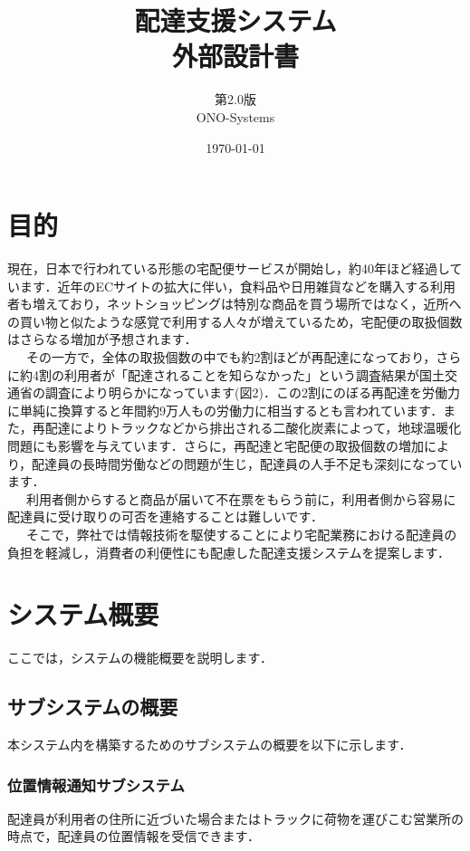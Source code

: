 \documentclass[a4j,titlepage]{jarticle}
\title{\huge 配達支援システム\\
		外部設計書}
\author{第2.0版\\
        ONO-Systems\\}
\date{\today}
\begin{document}
\maketitle

\tableofcontents
\clearpage

\section{目的}
現在，日本で行われている形態の宅配便サービスが開始し，約40年ほど経過しています．近年のECサイトの拡大に伴い，食料品や日用雑貨などを購入する利用者も増えており，ネットショッピングは特別な商品を買う場所ではなく，近所への買い物と似たような感覚で利用する人々が増えているため，宅配便の取扱個数はさらなる増加が予想されます\cite{ref1}．\\
\ \ \ その一方で，全体の取扱個数の中でも約2割ほどが再配達になっており，さらに約4割の利用者が「配達されることを知らなかった」という調査結果が国土交通省の調査により明らかになっています(図2)．この2割にのぼる再配達を労働力に単純に換算すると年間約9万人もの労働力に相当するとも言われています．また，再配達によりトラックなどから排出される二酸化炭素によって，地球温暖化問題にも影響を与えています．さらに，再配達と宅配便の取扱個数の増加により，配達員の長時間労働などの問題が生じ，配達員の人手不足も深刻になっています\cite{ref1}．\\
\ \ \ 利用者側からすると商品が届いて不在票をもらう前に，利用者側から容易に配達員に受け取りの可否を連絡することは難しいです．\\
\ \ \ そこで，弊社では情報技術を駆使することにより宅配業務における配達員の負担を軽減し，消費者の利便性にも配慮した配達支援システムを提案します．

\section{システム概要}
ここでは，システムの機能概要を説明します．

\subsection{サブシステムの概要}
本システム内を構築するためのサブシステムの概要を以下に示します．

\subsubsection{位置情報通知サブシステム}
配達員が利用者の住所に近づいた場合またはトラックに荷物を運びこむ営業所の時点で，配達員の位置情報を受信できます．
\end{document}

